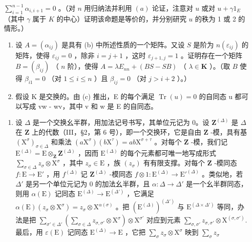 \(\sum_{i=1}^{n-1} \alpha_{i, i+1} = 0\) 。（对 \(n\) 用归纳法并利用 \((a)\) 论证，注意对 \(u\) 或对 \(u + \gamma 1_{E}\) （其中 \(\gamma\) 属于 \(K\) 的中心）证明该命题是等价的，并分别研究 \(u\) 的秩为 1 或 2 的情形。）

\begin{enumerate}
\def\labelenumi{(\alph{enumi})}
\setcounter{enumi}{2}
\item
  设 \(A = (\alpha_{ij})\) 是具有 (b) 中所述性质的一个矩阵。又设 \(S\) 是阶为 \(n(\varepsilon_{ij})\) 的矩阵，使得 \(\varepsilon_{ij} = 0\) ，除非 \(i = j + 1\) ，这时 \(\varepsilon_{j+1,j} = 1\) 。证明存在一个矩阵 \(B = (\beta_{ij})\) （ \(n\) 阶），使得 \(A = \lambda E_{nn} + (BS - SB)\) （ \(\lambda \in \mathbf{K}\) ）。（取 \(B\) 使得 \(\beta_{i1} = 0\) （对 \(1 \leqslant i \leqslant n\) ）且 \(\beta_{ij} = 0\) （对 \(j > i + 2\) ）。）
\item
  假设 K 是交换的。由 (c) 推出，E 的每个满足 \(\operatorname{Tr}(u) = 0\) 的自同态 u 都可以写成 vw - wv，其中 v 和 w 是 E 的自同态。
\end{enumerate}

\BourbakiExercisesSection

\begin{enumerate}
\def\labelenumi{\arabic{enumi}.}
\tightlist
\item
  设 \(\Delta\) 是一个交换幺半群，用加法记号书写，其单位元记为 0。设 \(\mathbf{Z}^{(\Delta)}\) 是 \(\Delta\) 在 \(\mathbf{Z}\) 上的代数（III，§2，第 6 号），即一个交换环，它是自由 \(\mathbf{Z}\) -模，具有基 \((\mathrm{X}^{\sigma})_{\sigma \in \Delta}\) 和乘法 \((a\mathrm{X}^{\sigma})(b\mathrm{X}^{\tau}) = ab\mathrm{X}^{\sigma +\tau}\) 。对每个 \(\mathbf{Z}\) -模，我们记 \(\mathrm{E}^{(\Delta)} = \mathrm{E} \otimes_{\mathbf{Z}} \mathbf{Z}^{(\Delta)}\) ，因而 \(\mathrm{E}^{(\Delta)}\) 的每个元素都可唯一地写成形式 \(\sum_{\sigma \in \Delta} z_{\sigma} \otimes \mathrm{X}^{\sigma}\) ，其中 \(z_{\sigma} \in \mathrm{E}\) ，族 \((z_{\sigma})\) 有有限支撑。对每个 \(\mathbf{Z}\) -模同态 \(f: \mathrm{E} \to \mathrm{E}'\) ，用 \(f^{(\Delta)}\) 记 \(\mathbf{Z}^{(\Delta)}\) -模同态 \(f \otimes 1: \mathrm{E}^{(\Delta)} \to \mathrm{E}'^{(\Delta)}\) 。类似地，若 \(\Delta'\) 是另一个单位元记为 0 的加法幺半群，且 \(\alpha: \Delta \to \Delta'\) 是一个幺半群同态，则用 \(\alpha(\mathrm{E})\) 记同态 \(\mathrm{E}^{(\Delta)} \to \mathrm{E}^{(\Delta')}\) ，它满足 \(\alpha(\mathrm{E})(z_{\sigma} \otimes \mathrm{X}^{\sigma}) = z_{\sigma} \otimes \mathrm{X}^{\alpha(\sigma)}\) 。把 \((\mathrm{E}^{(\Delta)})^{(\Delta')}\) 与 \(\mathrm{E}^{(\Delta \times \Delta')}\) 等同，办法是把 \(\sum_{\sigma' \in \Delta'} \left( \sum_{\sigma \in \Delta} z_{\sigma, \sigma'} \otimes \mathrm{X}^{\sigma} \right) \otimes \mathrm{X}^{\sigma'}\) 对应到元素 \(\sum_{\sigma, \sigma'} z_{\sigma, \sigma'} \otimes \mathrm{X}^{(\sigma, \sigma')}.\) 最后，用 \(\varepsilon(\mathrm{E})\) 记同态 \(\mathrm{E}^{(\Delta)} \to \mathrm{E}\) ，它把 \(\sum_{\sigma} z_{\sigma} \otimes \mathrm{X}^{\sigma}\) 映到 \(\sum_{\sigma} z_{\sigma}\)
\end{enumerate}

